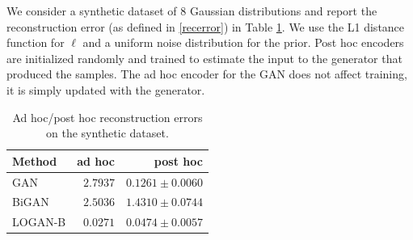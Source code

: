 \documentclass[10pt,twocolumn,letterpaper]{article}
\begin{document}
We consider a synthetic dataset of $8$ Gaussian distributions and report the reconstruction error (as defined in \ref{recerror}) in Table \ref{tab:synthetic_err}. We use the L1 distance function for $\ell$ and a uniform noise distribution for the prior. Post hoc encoders are initialized randomly and trained to estimate the input to the generator that produced the samples. The ad hoc encoder for the GAN does not affect training, it is simply updated with the generator.

\begin{table}[!ht]
    \centering
    \begin{tabular}{lrr}
        Method & ad hoc & post hoc \\\hline
        GAN     & $2.7937$ & $0.1261 \pm 0.0060$ \\
        BiGAN   & $2.5036$ & $1.4310 \pm 0.0744$ \\
        LOGAN-B & $0.0271$ & $0.0474 \pm 0.0057$ \\
    \end{tabular}
    \caption{Ad hoc/post hoc reconstruction errors on the synthetic dataset.}
    \label{tab:synthetic_err}
\end{table}
\end{document}
